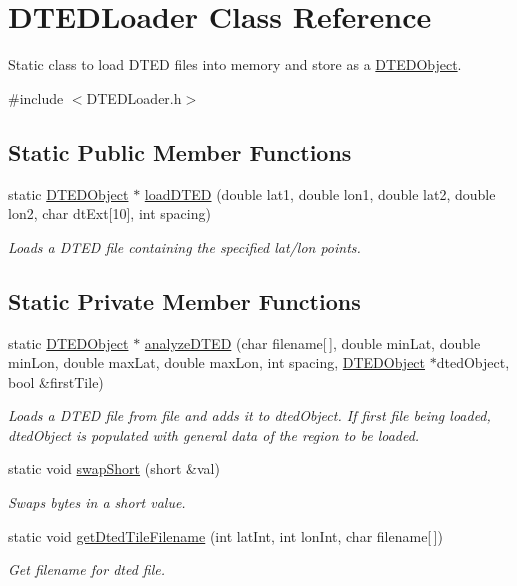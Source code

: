 \hypertarget{class_d_t_e_d_loader}{
\section{DTEDLoader Class Reference}
\label{class_d_t_e_d_loader}
}


Static class to load DTED files into memory and store as a \hyperlink{class_d_t_e_d_object}{DTEDObject}.  




{\ttfamily \#include $<$DTEDLoader.h$>$}

\subsection*{Static Public Member Functions}
\begin{DoxyCompactItemize}
\item 
static \hyperlink{class_d_t_e_d_object}{DTEDObject} $\ast$ \hyperlink{class_d_t_e_d_loader_a7d7d76fc4749c71cd8923aa771b07ee5}{loadDTED} (double lat1, double lon1, double lat2, double lon2, char dtExt\mbox{[}10\mbox{]}, int spacing)
\begin{DoxyCompactList}\small\item\em Loads a DTED file containing the specified lat/lon points. \end{DoxyCompactList}\end{DoxyCompactItemize}
\subsection*{Static Private Member Functions}
\begin{DoxyCompactItemize}
\item 
static \hyperlink{class_d_t_e_d_object}{DTEDObject} $\ast$ \hyperlink{class_d_t_e_d_loader_a4c08c924e0866229242b87454245deb8}{analyzeDTED} (char filename\mbox{[}$\,$\mbox{]}, double minLat, double minLon, double maxLat, double maxLon, int spacing, \hyperlink{class_d_t_e_d_object}{DTEDObject} $\ast$dtedObject, bool \&firstTile)
\begin{DoxyCompactList}\small\item\em Loads a DTED file from file and adds it to dtedObject. If first file being loaded, dtedObject is populated with general data of the region to be loaded. \end{DoxyCompactList}\item 
static void \hyperlink{class_d_t_e_d_loader_a0c8d977e840335567aee9905fa28eb73}{swapShort} (short \&val)
\begin{DoxyCompactList}\small\item\em Swaps bytes in a short value. \end{DoxyCompactList}\item 
static void \hyperlink{class_d_t_e_d_loader_ac343c0a56c397f3dcd229526c312a33b}{getDtedTileFilename} (int latInt, int lonInt, char filename\mbox{[}$\,$\mbox{]})
\begin{DoxyCompactList}\small\item\em Get filename for dted file. \end{DoxyCompactList}\end{DoxyCompactItemize}


